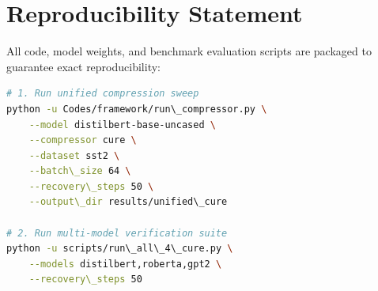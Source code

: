 \section{Reproducibility Statement}
All code, model weights, and benchmark evaluation scripts are packaged to guarantee exact reproducibility:
\begin{lstlisting}[language=bash]
# 1. Run unified compression sweep
python -u Codes/framework/run\_compressor.py \
    --model distilbert-base-uncased \
    --compressor cure \
    --dataset sst2 \
    --batch\_size 64 \
    --recovery\_steps 50 \
    --output\_dir results/unified\_cure

# 2. Run multi-model verification suite
python -u scripts/run\_all\_4\_cure.py \
    --models distilbert,roberta,gpt2 \
    --recovery\_steps 50
\end{lstlisting}
